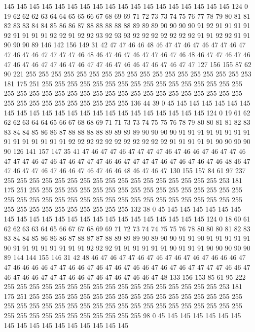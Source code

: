 145 145 145 145 145 145 145 145 145 145 145 145 145 145 145 145 145 145 124 0
19 62 62 62 63 64 64 65 65 66 67 68 69 69 71 72 73 73 74 75
76 77 78 79 80 81 81 82 83 83 84 84 85 86 86 87 88 88 88 88
88 89 89 89 90 90 90 90 91 92 91 91 91 91 92 91 91 91 91 92
92 91 92 92 93 92 93 93 92 92 92 92 92 92 92 91 91 92 92 91
91 90 90 90 89 146 142 156 149 31 42 47 47 46 46 48 46 47 47 46
47 46 47 47 46 47 47 46 47 46 47 47 47 47 46 48 46 47 46 47
46 47 47 46 47 46 48 46 47 47 46 47 46 47 46 47 46 47 47 46
47 46 47 47 46 47 46 46 47 46 47 46 47 47 127 156 155 87 62 90
221 255 255 255 255 255 255 255 255 255 255 255 255 255 255 255 255 255 253 181
175 251 255 255 255 255 255 255 255 255 255 255 255 255 255 255 255 255 255 255
255 255 255 255 255 255 255 255 255 255 255 255 255 255 255 255 255 255 255 255
255 255 255 255 255 255 255 136 44 39 0 45 145 145 145 145 145 145 145 145
145 145 145 145 145 145 145 145 145 145 145 145 145 145 124 0 19 61 62 62
62 63 64 64 65 66 67 68 68 69 71 71 73 73 74 75 75 76 78 79
80 80 81 81 82 83 83 84 84 85 86 86 87 88 88 88 88 89 89 89
89 90 90 90 90 91 91 91 91 91 91 91 91 91 91 91 91 91 91 91
92 92 92 92 92 92 92 92 92 92 92 91 91 91 91 91 90 90 90 90
90 126 141 157 147 35 41 47 46 47 47 46 47 47 47 47 46 47 46 46
47 46 47 47 46 47 47 47 46 47 46 47 46 47 47 47 46 46 47 47
47 47 46 47 46 47 46 47 46 48 46 47 47 46 47 47 46 47 46 46
47 46 47 46 46 48 46 47 46 47 130 155 157 84 61 97 237 255 255 255
255 255 255 255 255 255 255 255 255 255 255 255 255 255 253 181 175 251 255 255
255 255 255 255 255 255 255 255 255 255 255 255 255 255 255 255 255 255 255 255
255 255 255 255 255 255 255 255 255 255 255 255 255 255 255 255 255 255 255 255
255 255 255 255 132 38 0 45 145 145 145 145 145 145 145 145 145 145 145 145
145 145 145 145 145 145 145 145 145 145 124 0 18 60 61 62 62 63 63 64
65 66 67 67 68 69 69 71 72 73 74 74 75 75 76 78 80 80 80 81
82 83 83 84 84 85 86 86 86 87 88 87 87 88 89 89 89 90 89 90
90 91 91 90 91 91 91 91 91 90 91 91 91 91 91 91 91 91 92 92
92 91 91 91 91 91 91 90 91 91 91 90 90 90 90 90 89 144 144 155
146 31 42 48 46 47 46 47 47 46 47 46 47 46 47 46 47 46 46 46
47 47 46 46 46 46 47 47 46 46 47 46 47 46 47 46 46 47 46 47
46 47 47 47 47 46 46 47 46 47 46 46 47 47 47 46 46 47 46 47
46 47 46 46 47 48 133 156 153 85 61 95 222 255 255 255 255 255 255 255
255 255 255 255 255 255 255 255 255 255 253 181 175 251 255 255 255 255 255 255
255 255 255 255 255 255 255 255 255 255 255 255 255 255 255 255 255 255 255 255
255 255 255 255 255 255 255 255 255 255 255 255 255 255 255 255 255 255 255 255
255 98 0 45 145 145 145 145 145 145 145 145 145 145 145 145 145 145 145 145
